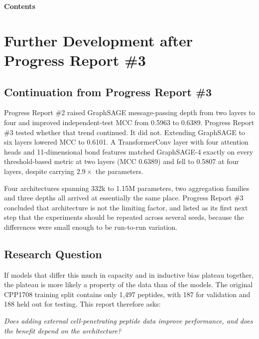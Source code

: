 \documentclass[11pt,a4paper]{article}
\begin{document}
\newpage
{\sffamily\bfseries\Large\color{navy}Contents}
\vspace{0.5em}
\renewcommand{\contentsname}{}
\vspace{-2.5em}
\tableofcontents
\newpage

\section{Further Development after Progress Report \#3}

\subsection{Continuation from Progress Report \#3}
Progress Report \#2 raised GraphSAGE message-passing depth from two layers to four and improved
independent-test MCC from 0.5963 to 0.6389. Progress Report \#3 tested whether that trend continued.
It did not. Extending GraphSAGE to six layers lowered MCC to 0.6101. A TransformerConv layer with four
attention heads and 11-dimensional bond features matched GraphSAGE-4 exactly on every threshold-based
metric at two layers (MCC 0.6389) and fell to 0.5807 at four layers, despite carrying $2.9\times$ the
parameters.

Four architectures spanning 332k to 1.15M parameters, two aggregation families and three depths all
arrived at essentially the same place. Progress Report \#3 concluded that architecture is not the
limiting factor, and listed as its first next step that the experiments should be repeated across
several seeds, because the differences were small enough to be run-to-run variation.

\subsection{Research Question}
If models that differ this much in capacity and in inductive bias plateau together, the plateau is more
likely a property of the data than of the models. The original CPP1708 training split contains only
1{,}497 peptides, with 187 for validation and 188 held out for testing. This report therefore asks:

\begin{center}
\colorbox{bandg}{\parbox{0.93\textwidth}{\vspace{1mm}\itshape
Does adding external cell-penetrating peptide data improve performance, and does the benefit depend on
the architecture?\vspace{1mm}}}
\end{center}
\end{document}
